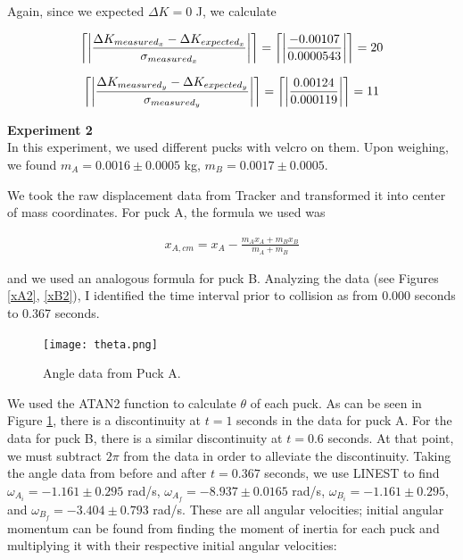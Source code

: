 \documentclass[11pt]{article}
\DeclarePairedDelimiter{\ceil}{\lceil}{\rceil}
\begin{document}
Again, since we expected $\Delta K = 0$ J, we calculate

\begin{align}
\ceil*{\left\vert\frac{\Delta K_{measured_x}-\Delta K_{expected_x}}{\sigma_{measured_x}}\right\vert} = \ceil*{\left\vert\frac{-0.00107}{0.0000543}\right\vert} = 20
\label{errKx}
\end{align}

\begin{align}
\ceil*{\left\vert\frac{\Delta K_{measured_y}-\Delta K_{expected_y}}{\sigma_{measured_y}}\right\vert} = \ceil*{\left\vert\frac{0.00124}{0.000119}\right\vert} = 11
\label{errKy}
\end{align}


{\bf Experiment 2}\\

In this experiment, we used different pucks with velcro on them. Upon weighing, we found $m_A = 0.0016 \pm 0.0005$ kg, $m_B = 0.0017 \pm 0.0005$.

We took the raw displacement data from Tracker and transformed it into center of mass coordinates. For puck A, the formula we used was

\begin{align}
x_{A,cm}=x_A-\frac{m_A x_A+ m_B x_B}{m_A + m_B}
\end{align}

and we used an analogous formula for puck B. Analyzing the data (see Figures \ref{xA2}, \ref{xB2}), I identified the time interval prior to collision as from 0.000 seconds to 0.367 seconds. 

\begin{figure}[!h]
   \begin{floatrow}
   \end{floatrow}
\end{figure}

\begin{figure}[h]
\centering
\texttt{[image: theta.png]}
\caption{Angle data from Puck A.}
\label{theta}
\end{figure}

We used the ATAN2 function to calculate $\theta$ of each puck. As can be seen in Figure \ref{theta}, there is a discontinuity at $t=1$ seconds in the data for puck A. For the data for puck B, there is a similar discontinuity at $t=0.6$ seconds. At that point, we must subtract $2\pi$ from the data in order to alleviate the discontinuity. Taking the angle data from before and after $t=0.367$ seconds, we use LINEST to find $\omega_{A_i}=-1.161\pm0.295$ rad/s, $\omega_{A_f} = -8.937\pm0.0165$ rad/s, $\omega_{B_i}=-1.161\pm0.295$, and $\omega_{B_f} = -3.404\pm 0.793$ rad/s. These are all angular velocities; initial angular momentum can be found from finding the moment of inertia for each puck and multiplying it with their respective initial angular velocities:
\end{document}
